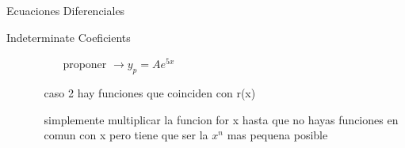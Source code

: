 \begin{section}{Ecuaciones Diferenciales}
\begin{subsection}{Indeterminate Coeficients}
\begin{enumerate}
\begin{enumerate}
\begin{enumerate}
								proponer $\rightarrow y_p = Ae^{5x}$
						\end{enumerate}
					\item[caso 2] hay funciones que coinciden con r(x)
		
						simplemente multiplicar la funcion for x hasta que no hayas funciones en comun con x
						pero tiene que ser la $x^n$ mas pequena posible
				\end{enumerate}
		
		\end{enumerate}

	\end{subsection}

\end{section}
	




